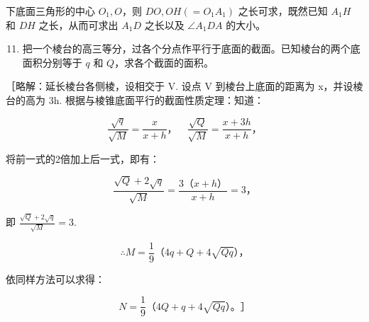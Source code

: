 下底面三角形的中心 \(O_{1}, O\)，则 \(DO, OH (= O_{1}A_{1})\)
之长可求，既然已知 \(A_{1}H\) 和 \(DH\) 之长，从而可求出 \(A_{1}D\)
之长以及 \(\angle A_{1}DA\) 的大小。

\begin{enumerate}
\setcounter{enumi}{10}
\item
  把一个棱台的高三等分，过各个分点作平行于底面的截面。已知棱台的两个底面积分别等于
  \(q\) 和 \(Q\)，求各个截面的面积。
\end{enumerate}

［略解：延长棱台各侧棱，设相交于 V. 设点 V 到棱台上底面的距离为
x，并设棱台的高为 3h. 根据与棱锥底面平行的截面性质定理：知道：

\[
\frac {\sqrt {q}}{\sqrt {M}} = \frac {x}{x + h}\text{，} \quad \frac {\sqrt {Q}}{\sqrt {M}} = \frac {x + 3 h}{x + h}\text{，}
\]

将前一式的2倍加上后一式，即有：

\[
\frac {\sqrt {Q} + 2 \sqrt {q}}{\sqrt {M}} = \frac {3 \text{（}x + h\text{）}}{x + h} = 3\text{，}
\]

即 \(\frac{\sqrt{Q} + 2\sqrt{q}}{\sqrt{M}} = 3.\)

\[
\therefore M = \frac {1}{9} \text{（}4 q + Q + 4 \sqrt {Q q}\text{），}
\]

依同样方法可以求得：

\[
N = \frac {1}{9} \text{（}4 Q + q + 4 \sqrt {Q q}\text{）。} \text{］}
\]

